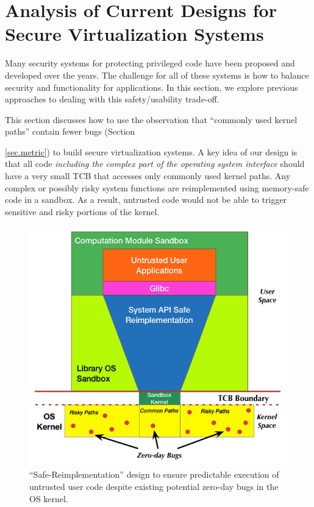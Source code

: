 \section{Analysis of Current Designs for Secure Virtualization Systems}
\label{sec.design}

Many security systems for protecting privileged code have been proposed and
developed over the years. The challenge for all of these systems is how to
balance security and functionality for applications. In this section, we explore previous approaches to
dealing with this safety/usability trade-off.

This section discusses how to use the observation
 that ``commonly used kernel paths'' contain fewer bugs
(Section {\ref{sec.metric}) to build secure virtualization systems.
A key idea of our design is that all code \emph{including the complex part
of the operating system interface} should have a very small TCB that accesses only
commonly used kernel paths.
Any complex or possibly risky system functions
are reimplemented using memory-safe code in a sandbox. 
As a result, untrusted code would not be able to
trigger sensitive and risky portions of the kernel.


\begin{figure}%
\centering
\includegraphics[width=1.0\columnwidth]{diagram/lind_secure_design_new.png}
\caption{\small ``Safe-Reimplementation'' design to ensure predictable execution of untrusted user code
despite existing potential zero-day bugs in the OS kernel.}
\label{fig:design}
\end{figure}

}
